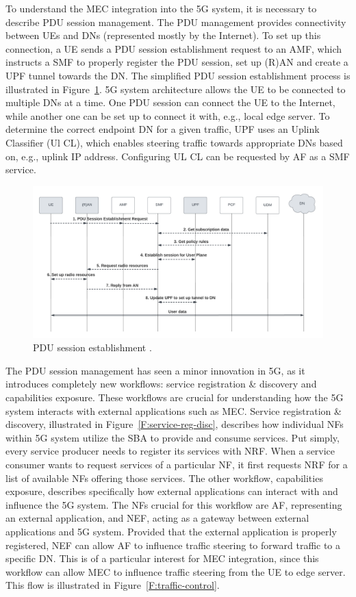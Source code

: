 \documentclass[12pt,a4paper,twoside]{report}
\begin{document}
To understand the MEC integration into the 5G system, it is necessary to describe PDU session management. The PDU management provides connectivity between UEs and DNs (represented mostly by the Internet). To set up this connection, a UE sends a PDU session establishment request to an AMF, which instructs a SMF to properly register the PDU session, set up (R)AN and create a UPF tunnel towards the DN. The simplified PDU session establishment process is illustrated in Figure~\ref{F:PDU-est}. 5G system architecture allows the UE to be connected to multiple DNs at a time. One PDU session can connect the UE to the Internet, while another one can be set up to connect it with, e.g., local edge server. To determine the correct endpoint DN for a given traffic, UPF uses an Uplink Classifier (Ul CL), which enables steering traffic towards appropriate DNs based on, e.g., uplink IP address. Configuring UL CL can be requested by AF as a SMF service. \cite{rommer20195g}

\begin{figure}[ht]
	\centering
	\includegraphics[width=\textwidth]{./images/PDU-sesh-est.png}
	\caption{PDU session establishment \cite{rommer20195g}.}
	\label{F:PDU-est}
\end{figure}

The PDU session management has seen a minor innovation in 5G, as it introduces completely new workflows: service registration \& discovery and capabilities exposure. These workflows are crucial for understanding how the 5G system interacts with external applications such as MEC. Service registration \& discovery, illustrated in Figure~\ref{F:service-reg-disc}, describes how individual NFs within 5G system utilize the SBA to provide and consume services. Put simply, every service producer needs to register its services with NRF. When a service consumer wants to request services of a particular NF, it first requests NRF for a list of available NFs offering those services. The other workflow, capabilities exposure, describes specifically how external applications can interact with and influence the 5G system. The NFs crucial for this workflow are AF, representing an external application, and NEF, acting as a gateway between external applications and 5G system. Provided that the external application is properly registered, NEF can allow AF to influence traffic steering to forward traffic to a specific DN. This is of a particular interest for MEC integration, since this workflow can allow MEC to influence traffic steering from the UE to edge server. This flow is illustrated in Figure~\ref{F:traffic-control}. \cite{rommer20195g}
\end{document}
